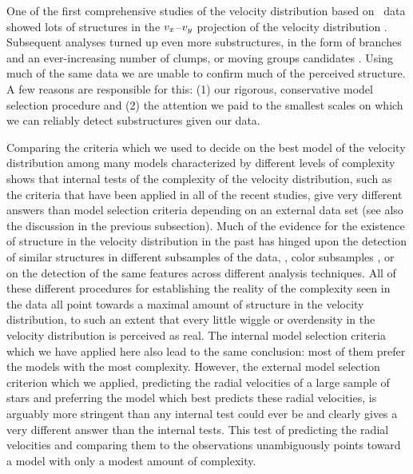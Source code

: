 One of the first comprehensive studies of the velocity distribution
based on \Hipparcos\ data showed lots of structures in the
$v_x$--$v_y$ projection of the velocity distribution
\citep{1998AJ....115.2384D}. Subsequent analyses turned up even more
substructures, in the form of branches \citep{1999MNRAS.308..731S} and
an ever-increasing number of clumps, or moving groups candidates
\citep{2008A&A...490..135A,2009ApJ...692L.113Z}. Using much of the
same data we are unable to confirm much of the perceived structure. A
few reasons are responsible for this: (1) our rigorous, conservative
model selection procedure and (2) the attention we paid to the
smallest scales on which we can reliably detect substructures given
our data.

Comparing the criteria which we used to decide on the best model of
the velocity distribution among many models characterized by different
levels of complexity shows that internal tests of the complexity of
the velocity distribution, such as the criteria that have been applied
in all of the recent studies, give very different answers than model
selection criteria depending on an external data set (see also the
discussion in the previous subsection). Much of the evidence for the
existence of structure in the velocity distribution in the past has
hinged upon the detection of similar structures in different
subsamples of the data, \eg, color subsamples
\citep{1998AJ....115.2384D}, or on the detection of the same features
across different analysis techniques. All of these different
procedures for establishing the reality of the complexity seen in the
data all point towards a maximal amount of structure in the velocity
distribution, to such an extent that every little wiggle
\citep{1998AJ....115.2384D} or overdensity in the velocity
distribution \citep{2009ApJ...692L.113Z} is perceived as real. The
internal model selection criteria which we have applied here also lead
to the same conclusion: most of them prefer the models with the most
complexity. However, the external model selection criterion which we
applied, predicting the radial velocities of a large sample of stars
and preferring the model which best predicts these radial velocities,
is arguably more stringent than any internal test could ever be and
clearly gives a very different answer than the internal tests. This
test of predicting the radial velocities and comparing them to the
observations unambiguously points toward a model with only a modest
amount of complexity. 

